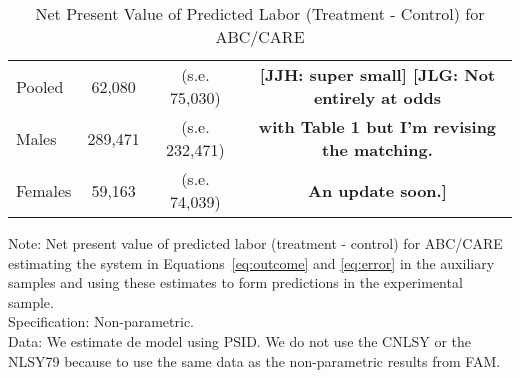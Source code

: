 \begin{table}[H] 
\begin{threeparttable}
\caption{Net Present Value of Predicted Labor (Treatment - Control) for ABC/CARE}
\label{table:yourlabel}
\centering 
\begin{tabular}{lccc} \toprule
Pooled & 62,080 & (s.e. 75,030) & \textbf{[JJH: super small] [JLG: Not entirely at odds}\\
Males & 289,471 & (s.e. 232,471) & \textbf{with Table 1 but I'm revising the matching.} \\ 
Females & 59,163 & (s.e. 74,039) & \textbf{An update soon.]} \\ \bottomrule
\end{tabular}
\end{threeparttable}
\end{table}
\begin{spacing}{1}
\begin{footnotesize}
\noindent Note: Net present value of predicted labor (treatment - control) for ABC/CARE estimating the system in Equations~\eqref{eq:outcome} and \eqref{eq:error} in the auxiliary samples and using these estimates to form predictions in the experimental sample.\\ 
\noindent Specification: Non-parametric. \\
Data: We estimate de model using PSID. We do not use the CNLSY or the NLSY79 because to use the same data as the non-parametric results from FAM. 
\end{footnotesize}
\end{spacing}




\singlespace






